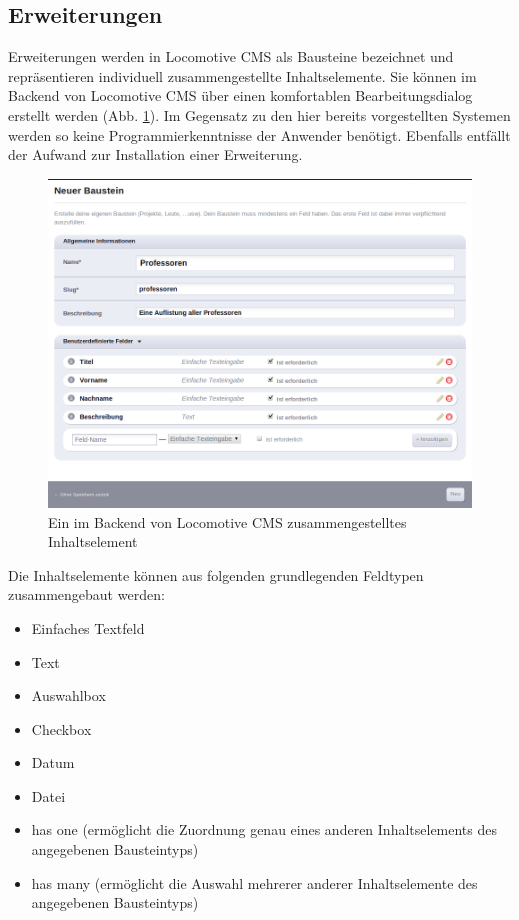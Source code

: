 \subsection{Erweiterungen}
\label{sec:ErweiterungenLocomotive}
Erweiterungen werden in Locomotive CMS als Bausteine bezeichnet und repräsentieren individuell zusammengestellte Inhaltselemente. Sie können im Backend von Locomotive CMS über einen komfortablen Bearbeitungsdialog erstellt werden (Abb. \ref{locomotivecontent}). Im Gegensatz zu den hier bereits vorgestellten Systemen werden so keine Programmierkenntnisse der Anwender benötigt. Ebenfalls entfällt der Aufwand zur Installation einer Erweiterung.
\begin{figure}[!h]
\begin{center}
\includegraphics[scale=0.45]{images/analyse/locomotive/customcontent.png}
\caption{Ein im Backend von Locomotive CMS zusammengestelltes Inhaltselement}
\label{locomotivecontent}
\end{center}
\end{figure}
\newpage
Die Inhaltselemente können aus folgenden grundlegenden Feldtypen zusammengebaut werden:
\begin{itemize}
\item
Einfaches Textfeld
\item
Text
\item
Auswahlbox
\item
Checkbox
\item
Datum
\item
Datei
\item
has one (ermöglicht die Zuordnung genau eines anderen Inhaltselements des angegebenen Bausteintyps)
\item
has many (ermöglicht die Auswahl mehrerer anderer Inhaltselemente des angegebenen Bausteintyps)
\end{itemize}

